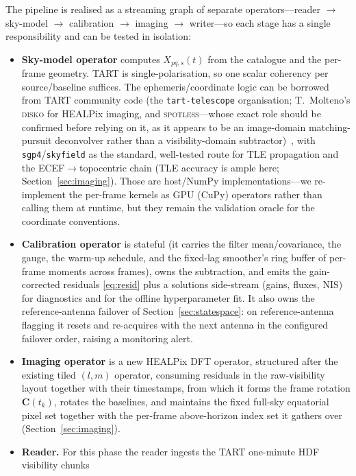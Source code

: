 \documentclass[11pt]{article}
\begin{document}
The pipeline is realised as a streaming graph of separate operators---reader $\to$ sky-model $\to$
calibration $\to$ imaging $\to$ writer---so each stage has a single responsibility and can be tested
in isolation:
\begin{itemize}[leftmargin=*]
  \item \textbf{Sky-model operator} computes $X_{pq,s}(t)$ from the catalogue and the per-frame
        geometry. TART is single-polarisation, so one scalar coherency per source/baseline suffices.
        The ephemeris/coordinate logic can be borrowed from TART community code (the
        \texttt{tart-telescope} organisation; T.~Molteno's \textsc{disko} for HEALPix imaging, and
        \textsc{spotless}---whose exact role should be confirmed before relying on it, as it appears
        to be an image-domain matching-pursuit deconvolver rather than a visibility-domain
        subtractor)~\cite{disko}, with \texttt{sgp4}/\texttt{skyfield} as the standard,
        well-tested route for TLE propagation and the ECEF$\to$topocentric chain (TLE accuracy is
        ample here; Section~\ref{sec:imaging}). Those are host/NumPy implementations---we
        re-implement the per-frame kernels as GPU (CuPy) operators rather than calling them at
        runtime, but they remain the validation oracle for the coordinate conventions.
  \item \textbf{Calibration operator} is stateful (it carries the filter mean/covariance, the gauge,
        the warm-up schedule, and the fixed-lag smoother's ring buffer of per-frame moments across
        frames), owns the subtraction, and emits the gain-corrected
        residuals \eqref{eq:resid} plus a solutions side-stream (gains, fluxes, NIS) for diagnostics
        and for the offline hyperparameter fit. It also owns the reference-antenna failover of
        Section~\ref{sec:statespace}: on reference-antenna flagging it resets and re-acquires with
        the next antenna in the configured failover order, raising a monitoring alert.
  \item \textbf{Imaging operator} is a new HEALPix DFT operator, structured after the existing tiled
        $(l,m)$ operator, consuming residuals in the raw-visibility layout together with their timestamps, from which it forms the frame rotation $\bm{C}(t_k)$, rotates the baselines, and maintains the fixed full-sky equatorial pixel set together with the per-frame above-horizon index set it gathers over (Section~\ref{sec:imaging}).
  \item \textbf{Reader.} For this phase the reader ingests the TART one-minute HDF visibility chunks

\end{itemize}
\end{document}
